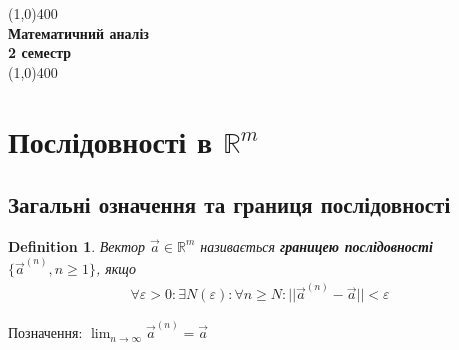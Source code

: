\documentclass[a4paper, 14pt]{extarticle}
\def\huge{\displaystyle}
\def\bigline{\vspace{5mm}\\}
\theoremstyle{theoremdd}
\theoremstyle{theoremdd}
\newtheorem{definition}[theorem]{Definition}
\theoremstyle{theoremdd}
\theoremstyle{theoremdd}
\theoremstyle{theoremdd}
\theoremstyle{theoremdd}
\theoremstyle{theoremdd}
\begin{document}
	\begin{titlepage}
		\begin{center}
		\hfill
		\vfill
		\line(1,0){400}\\
		\large{\textbf{Математичний аналіз}}\\[1mm]
		{\textbf{2 семестр}}\\[1mm]
		\line(1,0){400}\\
		\vfill
        	\end{center}
    	\end{titlepage}
\tableofcontents
\newpage

\section{Послідовності в $\mathbb{R}^m$}
\subsection{Загальні означення та границя послідовності}
\begin{definition}
Вектор $\vec{a} \in \mathbb{R}^m$ називається \textbf{границею послідовності} $\{\vec{a}^{(n)}, n \geq 1 \}$, якщо
\begin{align*}
\forall \varepsilon > 0: \exists N(\varepsilon): \forall n \geq N: ||\vec{a}^{(n)} - \vec{a}|| < \varepsilon
\end{align*}
\end{definition}
Позначення: $\huge \lim_{n \to \infty} \vec{a}^{(n)} = \vec{a}$
\bigline
\end{document}
